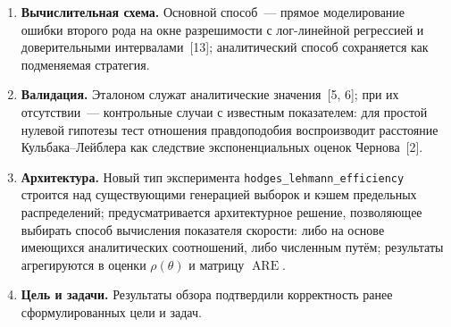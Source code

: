 \begin{enumerate}
  \item \textbf{Вычислительная схема.} Основной способ~--- прямое моделирование ошибки
        второго рода на окне разрешимости с лог-линейной регрессией и доверительными
        интервалами~[13]; аналитический способ сохраняется как подменяемая стратегия.
  \item \textbf{Валидация.} Эталоном служат аналитические значения~[5, 6]; при их
        отсутствии~--- контрольные случаи с известным показателем: для простой нулевой
        гипотезы тест отношения правдоподобия воспроизводит расстояние Кульбака--Лейблера
        как следствие экспоненциальных оценок Чернова~[2].
  \item \textbf{Архитектура.} Новый тип эксперимента \texttt{hodges\_lehmann\_efficiency}
        строится над существующими генерацией выборок и кэшем предельных распределений;
        предусматривается архитектурное решение, позволяющее выбирать способ вычисления
        показателя скорости: либо на основе имеющихся аналитических соотношений, либо
        численным путём; результаты агрегируются в оценки $\rho(\theta)$ и матрицу $\operatorname{ARE}$.
  \item \textbf{Цель и задачи.} Результаты обзора подтвердили корректность ранее
        сформулированных цели и задач.
\end{enumerate}

\clearpage